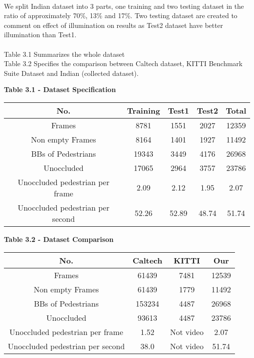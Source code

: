 \paragraph{} We split Indian dataset into 3 parts, one training and two testing dataset in the ratio of approximately 70\%, 13\% and 17\%. Two testing dataset are created to comment on effect of illumination on results as Test2 dataset have better illumination than Test1. 
\\
\\Table 3.1 Summarizes the whole dataset
\\Table 3.2 Specifies the comparison between Caltech dataset, KITTI Benchmark Suite Dataset and Indian (collected dataset).
\\

\begin{center}
\textbf{Table 3.1 - Dataset Specification}
\begin{table}[!h]
\center
 \begin{tabular}{|c|c|c|c|c|} 
 \hline
 No. & Training & Test1 & Test2 & Total\\ [0.5ex] 
 \hline
 Frames & 8781 & 1551 & 2027 & 12359\\ [0.5ex] 
 \hline
 Non empty Frames & 8164 & 1401 & 1927 & 11492\\ [0.5ex] 
 \hline
 BBs of Pedestrians & 19343 & 3449 & 4176 & 26968\\ [0.5ex] 
 \hline
 Unoccluded & 17065 & 2964 & 3757 & 23786\\ [0.5ex] 
 \hline
 Unoccluded pedestrian per frame & 2.09 & 2.12 & 1.95 & 2.07\\ [0.5ex] 
 \hline
 Unoccluded pedestrian per second & 52.26 & 52.89 & 48.74 & 51.74\\ [0.5ex] 
 \hline
 \end{tabular}
\end{table}
    
\end{center}
\begin{center}
\textbf{Table 3.2 - Dataset Comparison}
\begin{table}[!h]
\center
 \begin{tabular}{|c|c|c|c|} 
 \hline
 No. & Caltech & KITTI & Our \\ [0.5ex] 
 \hline
 Frames & 61439 & 7481 & 12539 \\ [0.5ex] 
 \hline
 Non empty Frames & 61439 & 1779 & 11492 \\ [0.5ex] 
 \hline
 BBs of Pedestrians & 153234 & 4487 & 26968 \\ [0.5ex] 
 \hline
 Unoccluded & 93613 & 4487 & 23786 \\ [0.5ex] 
 \hline
 Unoccluded pedestrian per frame & 1.52 & Not video & 2.07 \\ [0.5ex] 
 \hline
 Unoccluded pedestrian per second & 38.0 & Not video & 51.74 \\ [0.5ex] 
 \hline
 \end{tabular}
\end{table}
    
\end{center}
